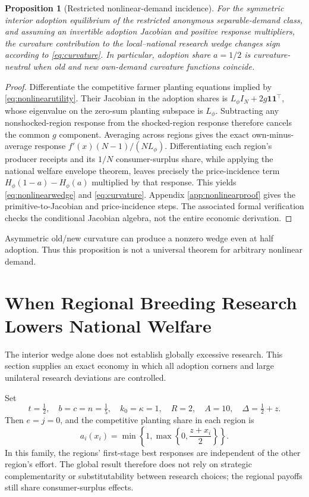 \documentclass[USenglish]{article}
\newtheorem{proposition}{Proposition}
\begin{document}
\begin{proposition}[Restricted nonlinear-demand incidence]
For the symmetric interior adoption equilibrium of the restricted anonymous separable-demand class, and assuming an invertible adoption Jacobian and positive response multipliers, the curvature contribution to the local--national research wedge changes sign according to \eqref{eq:curvature}. In particular, adoption share $a=1/2$ is curvature-neutral when old and new own-demand curvature functions coincide.
\end{proposition}
\begin{proof}
Differentiate the competitive farmer planting equations implied by \eqref{eq:nonlinearutility}. Their Jacobian in the adoption shares is $L_\phi I_N+2g\mathbf1\mathbf1^\top$, whose eigenvalue on the zero-sum planting subspace is $L_\phi$. Subtracting any nonshocked-region response from the shocked-region response therefore cancels the common $g$ component. Averaging across regions gives the exact own-minus-average response $f'(x)(N-1)/(NL_\phi)$. Differentiating each region's producer receipts and its $1/N$ consumer-surplus share, while applying the national welfare envelope theorem, leaves precisely the price-incidence term $H_\phi(1-a)-H_\phi(a)$ multiplied by that response. This yields \eqref{eq:nonlinearwedge} and \eqref{eq:curvature}. Appendix \ref{app:nonlinearproof} gives the primitive-to-Jacobian and price-incidence steps. The associated formal verification checks the conditional Jacobian algebra, not the entire economic derivation.
\end{proof}
Asymmetric old/new curvature can produce a nonzero wedge even at half adoption. Thus this proposition is not a universal theorem for arbitrary nonlinear demand.

\section{When Regional Breeding Research Lowers National Welfare}
The interior wedge alone does not establish globally excessive research. This section supplies an exact economy in which all adoption corners and large unilateral research deviations are controlled.

Set
\begin{equation}
 t=\tfrac12,\quad b=c=n=\tfrac15,\quad
 k_0=\kappa=1,\quad R=2,\quad A=10,\quad
 \Delta=\tfrac12+z.
 \label{eq:family}
\end{equation}
Then $e=j=0$, and the competitive planting share in each region is
\begin{equation}
 a_i(x_i)=\min\left\{1,\max\left\{0,\frac{z+x_i}{2}\right\}\right\}.
 \label{eq:clamp}
\end{equation}
In this family, the regions' first-stage best responses are independent of the other region's effort. The global result therefore does not rely on strategic complementarity or substitutability between research choices; the regional payoffs still share consumer-surplus effects.
\end{document}
